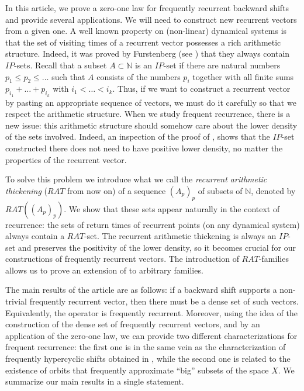 \documentclass[11pt]{amsart}
\newcommand{\zN}{\mathbb N}
\begin{document}
In this article, we prove a zero-one law for frequently recurrent backward shifts and provide several applications. We will need to construct new recurrent vectors from a given one.
A well known property on (non-linear) dynamical systems is that the set of visiting times of a recurrent vector possesses a rich arithmetic structure. Indeed, it was proved by Furstenberg (see \cite[Theorem 2.17]{Fur81}) that they always contain $IP$-sets. Recall that a subset  $A\subset\mathbb N$ is an $IP$-set if there are natural numbers $p_1\le p_2\le\dots$ such that $A$ consists of
the numbers $p_i$ together with all finite sums $p_{i_1}+\dots + p_{i_k}$ with
$i_1<\dots<i_k$. Thus, if we want to construct a recurrent vector by pasting an appropriate sequence of vectors, we must do it carefully so that we respect the arithmetic structure. When we study frequent recurrence, there is a new issue: this arithmetic structure should somehow care about the lower density of the sets involved. Indeed, an inspection of the proof of   \cite[Theorem 2.17]{Fur81}, shows that the $IP$-set constructed there does not need to have positive lower density, no matter the properties of the recurrent vector. 



To solve this problem  we introduce what we call the \emph{recurrent arithmetic thickening} ($RAT$ from now on) of a sequence $(A_p)_p$ of subsets of $\zN$, denoted by $RAT((A_p)_p)$.  We show that these sets appear naturally in the context of recurrence: the sets of return times of recurrent points (on any dynamical system) always contain a $RAT$-set. The recurrent arithmetic thickening is always an $IP$-set and preserves the positivity of the lower density, so it becomes crucial for our  constructions of frequently recurrent vectors. The introduction of $RAT$-families allows us to prove an extension of \cite[Theorem 2.17]{Fur81} to arbitrary families.


The main results of the article are as follows: if a backward shift supports a non-trivial frequently recurrent vector, then there must be a dense set of such vectors. Equivalently, the operator is frequently recurrent. Moreover, using the idea of the construction of the dense set of frequently recurrent vectors, and by an application of the zero-one law, we can provide two different characterizations for frequent recurrence: the first one is in the same vein as the characterization of frequently hypercyclic shifts obtained in \cite{BonGro18}, while the second one is related to the existence of orbits that frequently approximate ``big'' subsets of the space $X$. We summarize our main results in a single statement.
\end{document}
